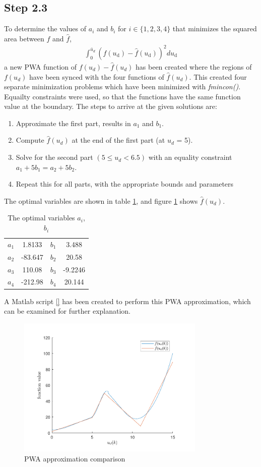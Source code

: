\subsection*{Step 2.3}
\label{sec:2.3}
To determine the values of $a_i$ and $b_i$ for $i \in \{1,2,3,4\}$ that minimizes the squared area between $f$ and $\hat{f}$, 
\begin{align}
    \int_{0}^{\bar{u}_{d}}\left(f\left(u_{\mathrm{d}}\right)-\hat{f}\left(u_{\mathrm{d}}\right)\right)^{2} d u_{\mathrm{d}} \label{eq:2.3cost}
\end{align}
a new PWA function of $f(u_d)-\hat{f}(u_d)$ has been created where the regions of $f(u_d)$ have been synced with the four functions of $\hat{f}(u_d)$. This created four separate minimization problems which have been minimized with \textit{fmincon()}. Equailty constraints were used, so that the functions have the same function value at the boundary. The steps to arrive at the given solutions are:
\begin{enumerate}
    \item Approximate the first part, results in $a_1$ and $b_1$.
    \item Compute $\hat{f}(u_d)$ at the end of the first part (at $u_d$ = 5).
    \item Solve for the second part $(5\leq u_d<6.5)$ with an equality constraint $a_1+5b_1 = a_2+5b_2$.
    \item Repeat this for all parts, with the appropriate bounds and parameters
\end{enumerate}
The optimal variables are shown in table \ref{tab:2.3table}, and figure \ref{fig:part23} shows $\hat{f}(u_d)$.\\
\begin{table}[h]
    \centering
    \caption{The optimal variables $a_i$, $b_i$}
    \begin{tabular}{c|c|c|c}
    \hline
         $a_1$ &  1.8133 & $b_1$ & 3.488 \\
         $a_2$ &  -83.647 & $b_2$ & 20.58  \\
         $a_3$ &  110.08 & $b_3$ & -9.2246 \\
         $a_4$ &  -212.98 & $b_4$ & 20.144   
    \end{tabular}
    
    \label{tab:2.3table}
    \end{table}
    
A Matlab script \ref{} has been created to perform this PWA approximation, which can be examined for further explanation.

\begin{figure}[ht]
    \centering
    \includegraphics[width=0.8\textwidth]{Latex/images/step23.pdf}
    \caption{PWA approximation comparison}
    \label{fig:part23}
\end{figure}
